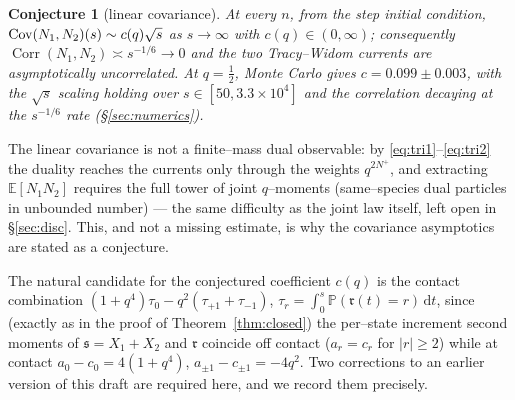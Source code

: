 \documentclass[11pt]{article}
\theoremstyle{plain}
\newtheorem{conjecture}[theorem]{Conjecture}
\theoremstyle{definition}
\theoremstyle{remark}
\DeclareMathOperator{\Corr}{Corr}\DeclareMathOperator{\cum}{cum}
\newcommand{\E}{\mathbb{E}}\newcommand{\PP}{\mathbb{P}}\newcommand{\dd}{\,\mathrm{d}}
\begin{document}
\begin{conjecture}[linear covariance]\label{conj:cov}
At every $n$, from the step initial condition,
$\operatorname{Cov}(N_1,N_2)(s)\sim c(q)\sqrt s$ as $s\to\infty$ with $c(q)\in(0,\infty)$;
consequently $\Corr(N_1,N_2)\asymp s^{-1/6}\to0$ and the two Tracy--Widom currents
are asymptotically uncorrelated. At $q=\tfrac12$, Monte Carlo gives
$c=0.099\pm0.003$, with the $\sqrt s$ scaling holding over
$s\in[50,3.3\times10^4]$ and the correlation decaying at the $s^{-1/6}$ rate
(\S\ref{sec:numerics}).
\end{conjecture}

The linear covariance is not a finite--mass dual observable: by
\eqref{eq:tri1}--\eqref{eq:tri2} the duality reaches the currents only through the
weights $q^{2N^+}$, and extracting $\E[N_1N_2]$ requires the full tower of joint
$q$--moments (same--species dual particles in unbounded number) --- the same
difficulty as the joint law itself, left open in \S\ref{sec:disc}. This, and not a
missing estimate, is why the covariance asymptotics are stated as a conjecture.

The natural candidate for the conjectured coefficient $c(q)$ is the contact
combination
$(1+q^4)\tau_0-q^2(\tau_{+1}+\tau_{-1})$, $\tau_r=\int_0^s\PP(\mathfrak r(t)=r)\dd t$,
since (exactly as in the proof of Theorem~\ref{thm:closed}) the per--state increment
second moments of $\mathfrak s=X_1+X_2$ and $\mathfrak r$ coincide off contact
($a_r=c_r$ for $|r|\ge2$) while at contact $a_0-c_0=4(1+q^4)$,
$a_{\pm1}-c_{\pm1}=-4q^2$. Two corrections to an earlier version of this draft are
required here, and we record them precisely.
\end{document}
